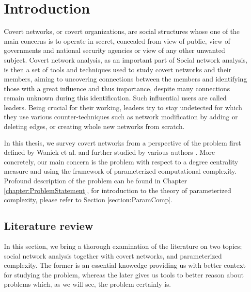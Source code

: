 \chapter*{Introduction}

\setcounter{page}{1}

Covert networks, or covert organizations, are social structures whose one of the main concerns is to operate in secret,
concealed from view of public, view of governments and national security agencies or view of any other unwanted subject.
Covert network analysis, as an important part of Social network analysis, is then a set of tools and techniques used to study
covert networks and their members, aiming to uncovering connections between the members and identifying those with a great
influence and thus importance, despite many connections remain unknown during this identification.
Such influential users are called leaders.
Being crucial for their working, leaders try to stay undetected for which they use various counter-techniques such as
network modification by adding or deleting edges, or creating whole new networks from scratch.

In this thesis, we survey covert networks from a perspective of the \HL problem first defined by
Waniek et al. \cite{Waniek2017} and further studied by various authors \cite{Dey2019,Waniek2021,Mohan2023}.
More concretely, our main concern is the \HL problem with respect to a degree centrality measure
and using the framework of parameterized computational complexity.
Profound description of the \HL problem can be found in Chapter \ref{chapter:ProblemStatement}, for introduction to
the theory of parameterized complexity, please refer to Section \ref{section:ParamComp}.


\section{Literature review}

In this section, we bring a thorough examination of the literature on two topics;
social network analysis together with covert networks, and parameterized complexity.
The former is an essential knowedge providing us with better context for studying the \HL problem, whereas
the later gives us tools to better reason about \NPh problems which, as we will see, the \HL problem certainly is.

